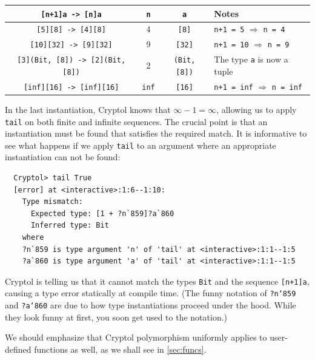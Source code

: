 
\begin{center}
\begin{tabular}[h]{c||c|c|l}
{\tt [n+1]a -> [n]a}                 & {\tt n}   & {\tt a}          & Notes \\ \hline\hline
{\tt [5][8] -> [4][8]}               &    4      & {\tt [8]}        & {\tt n+1 = 5} $\Rightarrow$ {\tt n = 4}  \\\hline
{\tt [10][32] -> [9][32]}            &    9      & {\tt [32]}       & {\tt n+1 = 10} $ \Rightarrow$ {\tt n = 9} \\\hline
{\tt [3](Bit, [8]) -> [2](Bit, [8])} &    2      & {\tt (Bit, [8])} & The type {\tt a} is now a tuple	           \\\hline
{\tt [inf][16] -> [inf][16]}         & {\tt inf} & {\tt [16]}       & {\tt n+1 = inf} $\Rightarrow$ {\tt n = inf}
\end{tabular}
\end{center}

In the last instantiation, Cryptol knows that $\infty - 1 = \infty$,
allowing us to apply {\tt tail} on both finite and infinite
sequences. The crucial point is that an instantiation must be found
that satisfies the required match.  It is informative to see what
happens if we apply {\tt tail} to an argument where an appropriate
instantiation can not be found:
\begin{Verbatim}
  Cryptol> tail True
  [error] at <interactive>:1:6--1:10:
    Type mismatch:
      Expected type: [1 + ?n`859]?a`860
      Inferred type: Bit
    where
    ?n`859 is type argument 'n' of 'tail' at <interactive>:1:1--1:5
    ?a`860 is type argument 'a' of 'tail' at <interactive>:1:1--1:5
\end{Verbatim}
Cryptol is telling us that it cannot match the types \texttt{Bit} and
the sequence \texttt{[n+1]a}, causing a type error statically at
compile time. (The funny notation of \texttt{?n`859} and
\texttt{?a`860} are due to how type instantiations proceed under the
hood. While they look funny at first, you soon get used to the
notation.)

We should emphasize that Cryptol polymorphism\indPolymorphism
uniformly applies to user-defined functions as well, as we shall see
in \autoref{sec:funcs}.

